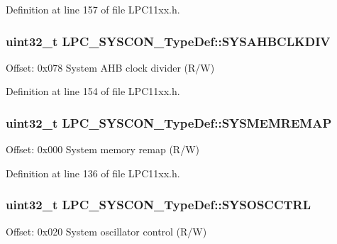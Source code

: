 Definition at line 157 of file L\+P\+C11xx.\+h.

\subsubsection[{\texorpdfstring{S\+Y\+S\+A\+H\+B\+C\+L\+K\+D\+IV}{SYSAHBCLKDIV}}]{ uint32\+\_\+t L\+P\+C\+\_\+\+S\+Y\+S\+C\+O\+N\+\_\+\+Type\+Def\+::\+S\+Y\+S\+A\+H\+B\+C\+L\+K\+D\+IV}\hypertarget{group___l_p_c11xx___definitions_ga2ddbe116af6e92606b3cce1ca897a4d0}{}\label{group___l_p_c11xx___definitions_ga2ddbe116af6e92606b3cce1ca897a4d0}
Offset\+: 0x078 System A\+HB clock divider (R/W) 

Definition at line 154 of file L\+P\+C11xx.\+h.

\subsubsection[{\texorpdfstring{S\+Y\+S\+M\+E\+M\+R\+E\+M\+AP}{SYSMEMREMAP}}]{ uint32\+\_\+t L\+P\+C\+\_\+\+S\+Y\+S\+C\+O\+N\+\_\+\+Type\+Def\+::\+S\+Y\+S\+M\+E\+M\+R\+E\+M\+AP}\hypertarget{group___l_p_c11xx___definitions_ga970fb69752548b297feae4645834cce1}{}\label{group___l_p_c11xx___definitions_ga970fb69752548b297feae4645834cce1}
Offset\+: 0x000 System memory remap (R/W) 

Definition at line 136 of file L\+P\+C11xx.\+h.

\subsubsection[{\texorpdfstring{S\+Y\+S\+O\+S\+C\+C\+T\+RL}{SYSOSCCTRL}}]{ uint32\+\_\+t L\+P\+C\+\_\+\+S\+Y\+S\+C\+O\+N\+\_\+\+Type\+Def\+::\+S\+Y\+S\+O\+S\+C\+C\+T\+RL}\hypertarget{group___l_p_c11xx___definitions_gafe759a051315e5daf1fe3d621bb72814}{}\label{group___l_p_c11xx___definitions_gafe759a051315e5daf1fe3d621bb72814}
Offset\+: 0x020 System oscillator control (R/W) 

